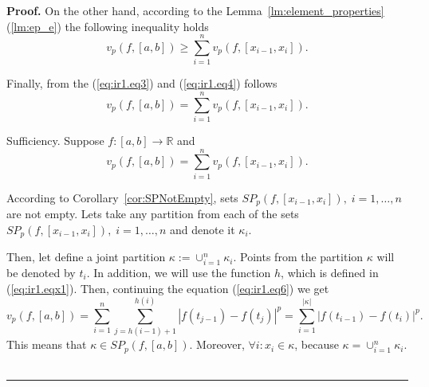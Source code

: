 \documentclass[12pt, a4paper]{article}
\newenvironment{proof}[1][Proof]{\noindent \textbf{#1.} }{\  \rule{0.5em}{0.5em}}
\numberwithin{equation}{section}
\begin{document}
\begin{proof}
  On the other hand, according to the 
  Lemma~\ref{lm:element_properties}(\ref{lm:ep_e}) 
  the following inequality holds
  \begin{equation}\label{eq:ir1.eq4}
    v_p(f,[a,b]) \geq \sum_{i=1}^n v_p(f,[x_{i-1},x_i]).
  \end{equation}
  
  Finally, from the (\ref{eq:ir1.eq3}) and (\ref{eq:ir1.eq4}) follows 
  \begin{equation}\label{eq:ir1.eq5}
    v_p(f,[a,b]) = \sum_{i=1}^n v_p(f,[x_{i-1},x_i]).
  \end{equation}
  
  Sufficiency. Suppose $f:[a,b] \rightarrow \mathbb{R}$ and 
  \begin{equation}\label{eq:ir1.eq6}
    v_p(f,[a,b]) = \sum_{i=1}^n v_p(f,[x_{i-1},x_i]).
  \end{equation}
  
  According to Corollary~\ref{cor:SPNotEmpty}, 
  sets $SP_{p}(f,[x_{i-1},x_i]),\;i=1,\dots,n$ are not empty.  
  Lets take any partition from each of the 
  sets $SP_{p}(f,[x_{i-1},x_i]),\;i=1,\dots,n$ and denote it $\kappa_i$.
    
  
  Then, let define a joint partition $\kappa:=\cup_{i=1}^n \kappa_i$. 
  Points from the partition $\kappa$ will be denoted by $t_i$. 
  In addition, we will use the function $h$, 
  which is defined in (\ref{eq:ir1.eqx1}).
  Then, continuing the equation (\ref{eq:ir1.eq6}) we get
  \begin{equation}\label{eq:ir1.eq7}
  v_p(f,[a,b]) = 
    \sum_{i=1}^n\sum_{j=h(i-1)+1}^{h(i)}|f(t_{j-1})-f(t_j)|^p
    =\sum_{i=1}^{|\kappa|}|f(t_{i-1})-f(t_i)|^p.
  \end{equation}
  This means that $\kappa \in SP_{p}(f,[a,b])$. 
  Moreover, $\forall i:x_i \in \kappa$,
  because $\kappa=\cup_{i=1}^n \kappa_i$.  
\end{proof}
\end{document}
